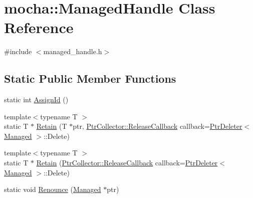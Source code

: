 \hypertarget{classmocha_1_1_managed_handle}{
\section{mocha::ManagedHandle Class Reference}
\label{classmocha_1_1_managed_handle}
}


{\ttfamily \#include $<$managed\_\-handle.h$>$}

\subsection*{Static Public Member Functions}
\begin{DoxyCompactItemize}
\item 
static int \hyperlink{classmocha_1_1_managed_handle_a164396ad3c163746cf94c87cc56df9ac}{AssignId} ()
\item 
{\footnotesize template$<$typename T $>$ }\\static T $\ast$ \hyperlink{classmocha_1_1_managed_handle_a37d5506197f103b180d88f19f3b7d2b5}{Retain} (T $\ast$ptr, \hyperlink{classmocha_1_1_ptr_collector_a5ec1946ab80fe57d29680f29ef30abb1}{PtrCollector::ReleaseCallback} callback=\hyperlink{structmocha_1_1_ptr_deleter}{PtrDeleter}$<$ \hyperlink{classmocha_1_1_managed}{Managed} $>$::Delete)
\item 
{\footnotesize template$<$typename T $>$ }\\static T $\ast$ \hyperlink{classmocha_1_1_managed_handle_a6c22298173e807c59f2bf821498471d6}{Retain} (\hyperlink{classmocha_1_1_ptr_collector_a5ec1946ab80fe57d29680f29ef30abb1}{PtrCollector::ReleaseCallback} callback=\hyperlink{structmocha_1_1_ptr_deleter}{PtrDeleter}$<$ \hyperlink{classmocha_1_1_managed}{Managed} $>$::Delete)
\item 
static void \hyperlink{classmocha_1_1_managed_handle_a19f03ef87e40113dfa4f153163f7a496}{Renounce} (\hyperlink{classmocha_1_1_managed}{Managed} $\ast$ptr)
\end{DoxyCompactItemize}
